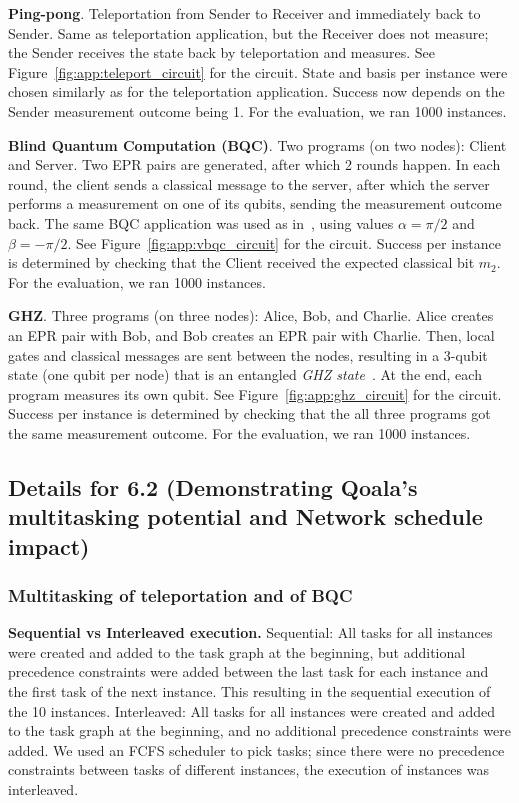 \textbf{Ping-pong}. Teleportation from Sender to Receiver and immediately back to Sender.
Same as teleportation application, but the Receiver does not measure; the Sender receives the state back by teleportation and measures.
See Figure~\ref{fig:app:teleport_circuit} for the circuit.
State and basis per instance were chosen similarly as for the teleportation application.
Success now depends on the Sender measurement outcome being 1.
For the evaluation, we ran 1000 instances.

\textbf{Blind Quantum Computation (BQC)}.
Two programs (on two nodes): Client and Server.
Two EPR pairs are generated, after which 2 rounds happen. In each round, the client sends a classical message to the server, after which the server performs a measurement on one of its qubits, sending the measurement outcome back.
The same BQC application was used as in~\cite{dahlberg2022netqasm}, using values $\alpha = \pi/2$ and $\beta = -\pi/2$.
See Figure~\ref{fig:app:vbqc_circuit} for the circuit.
Success per instance is determined by checking that the Client received the expected classical bit $m_2$.
For the evaluation, we ran 1000 instances.

\textbf{GHZ}. 
Three programs (on three nodes): Alice, Bob, and Charlie.
Alice creates an EPR pair with Bob, and Bob creates an EPR pair with Charlie.
Then, local gates and classical messages are sent between the nodes, resulting in a 3-qubit state (one qubit per node) that is an entangled \textit{GHZ state}~\cite{greenberger1989going}.
At the end, each program measures its own qubit.
See Figure~\ref{fig:app:ghz_circuit} for the circuit.
Success per instance is determined by checking that the all three programs got the same measurement outcome.
For the evaluation, we ran 1000 instances.

\subsection{Details for 6.2 (Demonstrating Qoala's multitasking potential and Network schedule impact)}

\subsubsection{Multitasking of teleportation and of BQC}
\textbf{Sequential vs Interleaved execution.}
Sequential: All tasks for all instances were created and added to the task graph at the beginning, but additional precedence constraints were added between the last task for each instance and the first task of the next instance. This resulting in the sequential execution of the 10 instances.
Interleaved: All tasks for all instances were created and added to the task graph at the beginning, and no additional precedence constraints were added. We used an FCFS scheduler to pick tasks; since there were no precedence constraints between tasks of different instances, the execution of instances was interleaved.

